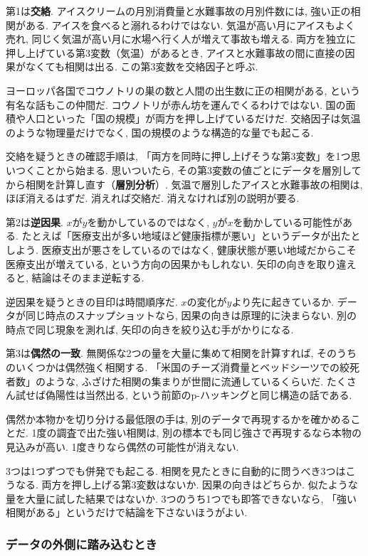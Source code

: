 第1は\textbf{交絡}.
アイスクリームの月別消費量と水難事故の月別件数には, 強い正の相関がある.
アイスを食べると溺れるわけではない. 気温が高い月にアイスもよく売れ, 同じく気温が高い月に水場へ行く人が増えて事故も増える.
両方を独立に押し上げている第3変数（気温）があるとき, アイスと水難事故の間に直接の因果がなくても相関は出る.
この第3変数を交絡因子と呼ぶ.

ヨーロッパ各国でコウノトリの巣の数と人間の出生数に正の相関がある, という有名な話もこの仲間だ.
コウノトリが赤ん坊を運んでくるわけではない. 国の面積や人口といった「国の規模」が両方を押し上げているだけだ.
交絡因子は気温のような物理量だけでなく, 国の規模のような構造的な量でも起こる.

交絡を疑うときの確認手順は, 「両方を同時に押し上げそうな第3変数」を1つ思いつくことから始まる.
思いついたら, その第3変数の値ごとにデータを層別してから相関を計算し直す（\textbf{層別分析}）.
気温で層別したアイスと水難事故の相関は, ほぼ消えるはずだ.
消えれば交絡だ. 消えなければ別の説明が要る.

第2は\textbf{逆因果}.
$x$が$y$を動かしているのではなく, $y$が$x$を動かしている可能性がある.
たとえば「医療支出が多い地域ほど健康指標が悪い」というデータが出たとしよう.
医療支出が悪さをしているのではなく, 健康状態が悪い地域だからこそ医療支出が増えている, という方向の因果かもしれない.
矢印の向きを取り違えると, 結論はそのまま逆転する.

逆因果を疑うときの目印は時間順序だ.
$x$の変化が$y$より先に起きているか. データが同じ時点のスナップショットなら, 因果の向きは原理的に決まらない.
別の時点で同じ現象を測れば, 矢印の向きを絞り込む手がかりになる.

第3は\textbf{偶然の一致}.
無関係な2つの量を大量に集めて相関を計算すれば, そのうちのいくつかは偶然強く相関する.
「米国のチーズ消費量とベッドシーツでの絞死者数」のような, ふざけた相関の集まりが世間に流通しているくらいだ.
たくさん試せば偽陽性は当然出る, という前節のp-ハッキングと同じ構造の話である.

偶然か本物かを切り分ける最低限の手は, 別のデータで再現するかを確かめることだ.
1度の調査で出た強い相関は, 別の標本でも同じ強さで再現するなら本物の見込みが高い. 1度きりなら偶然の可能性が消えない.

3つは1つずつでも併発でも起こる. 相関を見たときに自動的に問うべき3つはこうなる.
両方を押し上げる第3変数はないか. 因果の向きはどちらか. 似たような量を大量に試した結果ではないか.
3つのうち1つでも即答できないなら, 「強い相関がある」というだけで結論を下さないほうがよい.

\subsubsection*{データの外側に踏み込むとき}

